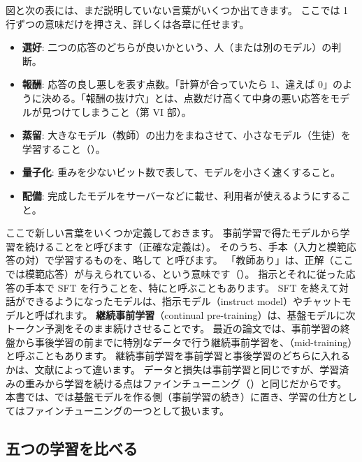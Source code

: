 図と次の表には、まだ説明していない言葉がいくつか出てきます。
ここでは 1 行ずつの意味だけを押さえ、詳しくは各章に任せます。

\begin{itemize}
\item \textbf{選好}: 二つの応答のどちらが良いかという、人（または別のモデル）の判断。
\item \textbf{報酬}: 応答の良し悪しを表す点数。「計算が合っていたら 1、違えば 0」のように決める。「報酬の抜け穴」とは、点数だけ高くて中身の悪い応答をモデルが見つけてしまうこと（第 VI 部）。
\item \textbf{蒸留}: 大きなモデル（教師）の出力をまねさせて、小さなモデル（生徒）を学習すること（）。
\item \textbf{量子化}: 重みを少ないビット数で表して、モデルを小さく速くすること。
\item \textbf{配備}: 完成したモデルをサーバーなどに載せ、利用者が使えるようにすること。
\end{itemize}

ここで新しい言葉をいくつか定義しておきます。
事前学習で得たモデルから学習を続けることをと呼びます（正確な定義は）。
そのうち、手本（入力と模範応答の対）で学習するものを、略して  と呼びます。
「教師あり」は、正解（ここでは模範応答）が与えられている、という意味です（）。
指示とそれに従った応答の手本で SFT を行うことを、特にと呼ぶこともあります\cite{wei2022finetuned}。
SFT を終えて対話ができるようになったモデルは、指示モデル（instruct model）やチャットモデルと呼ばれます。
\textbf{継続事前学習}（continual pre-training）は、基盤モデルに次トークン予測をそのまま続けさせることです。
最近の論文では、事前学習の終盤から事後学習の前までに特別なデータで行う継続事前学習を、（mid-training）と呼ぶこともあります。
継続事前学習を事前学習と事後学習のどちらに入れるかは、文献によって違います。
データと損失は事前学習と同じですが、学習済みの重みから学習を続ける点はファインチューニング（）と同じだからです。
本書では、では基盤モデルを作る側（事前学習の続き）に置き、学習の仕方としてはファインチューニングの一つとして扱います。

\subsection{五つの学習を比べる}

